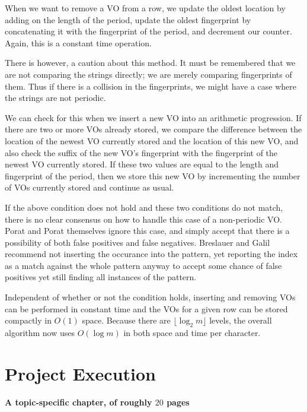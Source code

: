 \documentclass[ %
                    author={Dominic Joseph Moylett},
                supervisor={Dr. Raphael Clifford and Dr. Benjamin Sach},
                    degree={MEng},
                     title={Dictionary Matching with Fingerprints},
                  subtitle={An Empirical Analysis},
                      type={Research},
                      year={2014} ]{dissertation}
\begin{document}
When we want to remove a VO from a row, we update the oldest location by adding on the length of the period, update the oldest fingerprint by concatenating it with the fingerprint of the period, and decrement our counter. Again, this is a constant time operation.

There is however, a caution about this method. It must be remembered that we are not comparing the strings directly; we are merely comparing fingerprints of them. Thus if there is a collision in the fingerprints, we might have a case where the strings are not periodic.

We can check for this when we insert a new VO into an arithmetic progression. If there are two or more VOs already stored, we compare the difference between the location of the newest VO currently stored and the location of this new VO, and also check the suffix of the new VO's fingerprint with the fingerprint of the newest VO currently stored. If these two values are equal to the length and fingerprint of the period, then we store this new VO by incrementing the number of VOs currently stored and continue as usual.

If the above condition does not hold and these two conditions do not match, there is no clear consensus on how to handle this case of a non-periodic VO. Porat and Porat themselves ignore this case, and simply accept that there is a possibility of both false positives and false negatives. Breslauer and Galil\cite{Breslauer:2014:RSS:2660854.2635814} recommend not inserting the occurance into the pattern, yet reporting the index as a match against the whole pattern anyway to accept some chance of false positives yet still finding all instances of the pattern.

Independent of whether or not the condition holds, inserting and removing VOs can be performed in constant time and the VOs for a given row can be stored compactly in $O(1)$ space. Because there are $\lfloor\log_2m\rfloor$ levels, the overall algorithm now uses $O(\log m)$ in both space and time per character.


\chapter{Project Execution}
\label{chap:execution}

{\bf A topic-specific chapter, of roughly $20$ pages} 
\vspace{1cm} 
\end{document}
